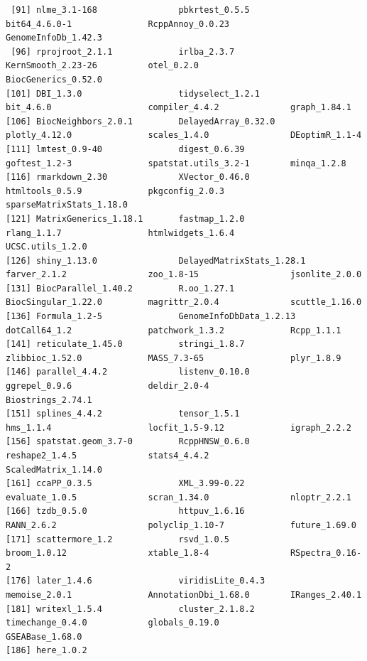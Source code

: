 \documentclass[
  landscape]{article}
\begin{document}
\begin{verbatim}
 [91] nlme_3.1-168                pbkrtest_0.5.5              bit64_4.6.0-1               RcppAnnoy_0.0.23            GenomeInfoDb_1.42.3        
 [96] rprojroot_2.1.1             irlba_2.3.7                 KernSmooth_2.23-26          otel_0.2.0                  BiocGenerics_0.52.0        
[101] DBI_1.3.0                   tidyselect_1.2.1            bit_4.6.0                   compiler_4.4.2              graph_1.84.1               
[106] BiocNeighbors_2.0.1         DelayedArray_0.32.0         plotly_4.12.0               scales_1.4.0                DEoptimR_1.1-4             
[111] lmtest_0.9-40               digest_0.6.39               goftest_1.2-3               spatstat.utils_3.2-1        minqa_1.2.8                
[116] rmarkdown_2.30              XVector_0.46.0              htmltools_0.5.9             pkgconfig_2.0.3             sparseMatrixStats_1.18.0   
[121] MatrixGenerics_1.18.1       fastmap_1.2.0               rlang_1.1.7                 htmlwidgets_1.6.4           UCSC.utils_1.2.0           
[126] shiny_1.13.0                DelayedMatrixStats_1.28.1   farver_2.1.2                zoo_1.8-15                  jsonlite_2.0.0             
[131] BiocParallel_1.40.2         R.oo_1.27.1                 BiocSingular_1.22.0         magrittr_2.0.4              scuttle_1.16.0             
[136] Formula_1.2-5               GenomeInfoDbData_1.2.13     dotCall64_1.2               patchwork_1.3.2             Rcpp_1.1.1                 
[141] reticulate_1.45.0           stringi_1.8.7               zlibbioc_1.52.0             MASS_7.3-65                 plyr_1.8.9                 
[146] parallel_4.4.2              listenv_0.10.0              ggrepel_0.9.6               deldir_2.0-4                Biostrings_2.74.1          
[151] splines_4.4.2               tensor_1.5.1                hms_1.1.4                   locfit_1.5-9.12             igraph_2.2.2               
[156] spatstat.geom_3.7-0         RcppHNSW_0.6.0              reshape2_1.4.5              stats4_4.4.2                ScaledMatrix_1.14.0        
[161] ccaPP_0.3.5                 XML_3.99-0.22               evaluate_1.0.5              scran_1.34.0                nloptr_2.2.1               
[166] tzdb_0.5.0                  httpuv_1.6.16               RANN_2.6.2                  polyclip_1.10-7             future_1.69.0              
[171] scattermore_1.2             rsvd_1.0.5                  broom_1.0.12                xtable_1.8-4                RSpectra_0.16-2            
[176] later_1.4.6                 viridisLite_0.4.3           memoise_2.0.1               AnnotationDbi_1.68.0        IRanges_2.40.1             
[181] writexl_1.5.4               cluster_2.1.8.2             timechange_0.4.0            globals_0.19.0              GSEABase_1.68.0            
[186] here_1.0.2                 
\end{verbatim}
\end{document}
